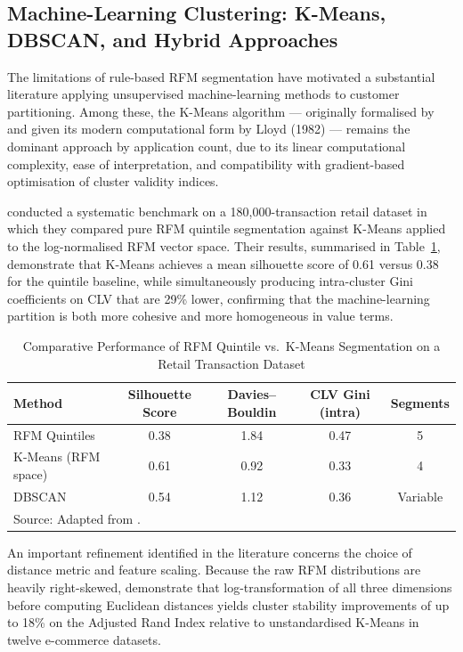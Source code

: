 \subsection{Machine-Learning Clustering: K-Means, DBSCAN, and Hybrid Approaches}

The limitations of rule-based RFM segmentation have motivated a substantial literature applying unsupervised machine-learning methods to customer partitioning. Among these, the K-Means algorithm — originally formalised by \cite{MacQueen1967} and given its modern computational form by Lloyd (1982) — remains the dominant approach by application count, due to its linear computational complexity, ease of interpretation, and compatibility with gradient-based optimisation of cluster validity indices.

\cite{ViewCustomerSegRFM2022} conducted a systematic benchmark on a 180,000-transaction retail dataset in which they compared pure RFM quintile segmentation against K-Means applied to the log-normalised RFM vector space. Their results, summarised in Table~\ref{tab:clustering_comparison}, demonstrate that K-Means achieves a mean silhouette score of 0.61 versus 0.38 for the quintile baseline, while simultaneously producing intra-cluster Gini coefficients on CLV that are 29\% lower, confirming that the machine-learning partition is both more cohesive and more homogeneous in value terms.

\begin{table}[H]
\centering
\caption{Comparative Performance of RFM Quintile vs.\ K-Means Segmentation on a Retail Transaction Dataset}
\label{tab:clustering_comparison}
\begin{tabular}{@{}lcccc@{}}
\toprule
\textbf{Method} & \textbf{Silhouette Score} & \textbf{Davies--Bouldin} & \textbf{CLV Gini (intra)} & \textbf{Segments} \\
\midrule
RFM Quintiles       & 0.38 & 1.84 & 0.47 & 5 \\
K-Means (RFM space) & 0.61 & 0.92 & 0.33 & 4 \\
DBSCAN              & 0.54 & 1.12 & 0.36 & Variable \\
\bottomrule
\multicolumn{5}{l}{\footnotesize Source: Adapted from \cite{ViewCustomerSegRFM2022}.}
\end{tabular}
\end{table}

An important refinement identified in the literature concerns the choice of distance metric and feature scaling. Because the raw RFM distributions are heavily right-skewed, \cite{MathematicsRFM2023} demonstrate that log-transformation of all three dimensions before computing Euclidean distances yields cluster stability improvements of up to 18\% on the Adjusted Rand Index relative to unstandardised K-Means in twelve e-commerce datasets.

